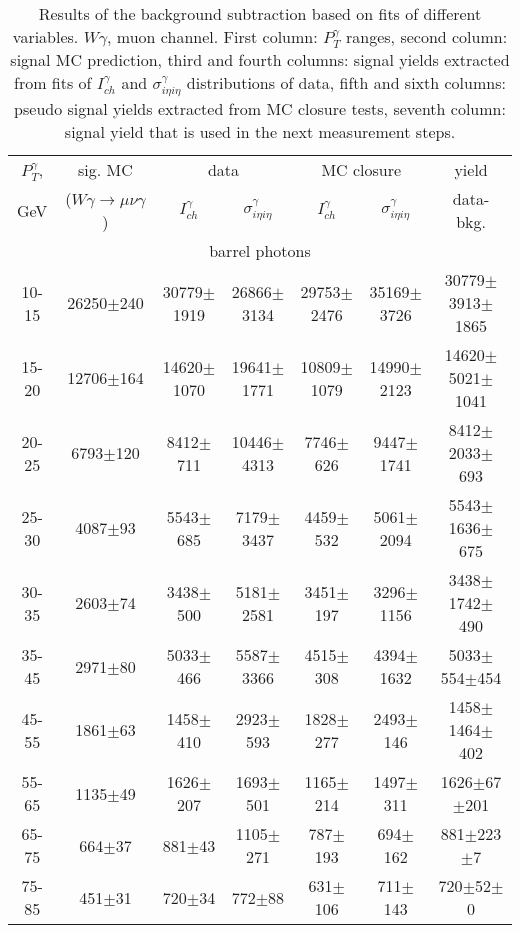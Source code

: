 \begin{table}[h]
  \tiny
  \begin{center}
  \caption{Results of the background subtraction based on fits of different variables. $W\gamma$, muon channel. First column: $P_T^{\gamma}$ ranges, second column: signal MC prediction, third and fourth columns: signal yields extracted from fits of $I_{ch}^{\gamma}$ and $\sigma_{i\eta i\eta}^\gamma$ distributions of data, fifth and sixth columns: pseudo signal yields extracted from MC closure tests, seventh column: signal yield that is used in the next measurement steps.}
  \begin{tabular}{|c|c|c|c|c|c|c|}
    $P_T^{\gamma}$, &  sig. MC   & \multicolumn{2}{|c|}{data}  & \multicolumn{2}{|c|}{MC closure} & yield\\ 
    GeV & ($W\gamma\rightarrow\mu\nu\gamma$) & $I_{ch}^{\gamma}$ & $\sigma_{i\eta i\eta}^\gamma$  & $I_{ch}^{\gamma}$  & $\sigma_{i\eta i\eta}^\gamma$   & data-bkg. \\ \hline
    \multicolumn{7}{|c|}{barrel photons} \\ \hline
    10-15 & 26250$\pm$240 & 30779$\pm$1919 & 26866$\pm$3134 & 29753$\pm$2476 & 35169$\pm$3726 &30779$\pm$3913$\pm$1865  \\ \hline
    15-20 & 12706$\pm$164 & 14620$\pm$1070 & 19641$\pm$1771 & 10809$\pm$1079 & 14990$\pm$2123 &14620$\pm$5021$\pm$1041  \\ \hline
    20-25 & 6793$\pm$120 & 8412$\pm$711 & 10446$\pm$4313 & 7746$\pm$626 & 9447$\pm$1741 &8412$\pm$2033$\pm$693  \\ \hline
    25-30 & 4087$\pm$93 & 5543$\pm$685 & 7179$\pm$3437 & 4459$\pm$532 & 5061$\pm$2094 &5543$\pm$1636$\pm$675  \\ \hline
    30-35 & 2603$\pm$74 & 3438$\pm$500 & 5181$\pm$2581 & 3451$\pm$197 & 3296$\pm$1156 &3438$\pm$1742$\pm$490  \\ \hline
    35-45 & 2971$\pm$80 & 5033$\pm$466 & 5587$\pm$3366 & 4515$\pm$308 & 4394$\pm$1632 &5033$\pm$554$\pm$454  \\ \hline
    45-55 & 1861$\pm$63 & 1458$\pm$410 & 2923$\pm$593 & 1828$\pm$277 & 2493$\pm$146 &1458$\pm$1464$\pm$402  \\ \hline
    55-65 & 1135$\pm$49 & 1626$\pm$207 & 1693$\pm$501 & 1165$\pm$214 & 1497$\pm$311 &1626$\pm$67$\pm$201  \\ \hline
    65-75 & 664$\pm$37 & 881$\pm$43 & 1105$\pm$271 & 787$\pm$193 & 694$\pm$162 &881$\pm$223$\pm$7  \\ \hline
    75-85 & 451$\pm$31 & 720$\pm$34 & 772$\pm$88 & 631$\pm$106 & 711$\pm$143 &720$\pm$52$\pm$0  \\ \hline

\end{tabular}
\end{center}
\end{table}
